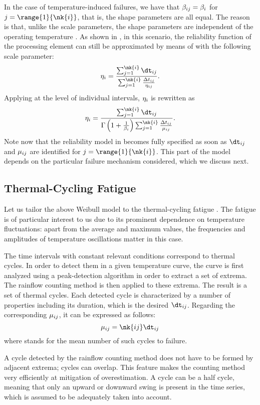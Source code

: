In the case of temperature-induced failures, we have that $\beta_{ij} =
\beta_i$ for $j = \range{1}{\nk{i}}$, that is, the shape parameters are all
equal. The reason is that, unlike the scale parameters, the shape parameters are
independent of the operating temperature \cite{chang2006}. As shown in
\cite{xiang2010}, in this scenario, the reliability function of the processing
element can still be approximated by means of  with
the following scale parameter:
\[
  \scale_i = \frac{\sum_{j = 1}^{\nk{i}} \dt_{ij}}{\sum_{j = 1}^{\nk{i}} \frac{\Delta t_{ij}}{\scale_{ij}}}.
\]
Applying  at the level of individual intervals,
$\eta_i$ is rewritten as
\[
  \scale_i = \frac{\sum_{j = 1}^{\nk{i}} \dt_{ij}}{\Gamma\left(1 + \frac{1}{\shape_i}\right) \sum_{j = 1}^{\nk{i}} \frac{\Delta t_{ij}}{\mean_{ij}}}.
\]
Note now that the reliability model in  becomes fully
specified as soon as $\dt_{ij}$ and $\mu_{ij}$ are identified for $j =
\range{1}{\nk{i}}$. This part of the model depends on the particular failure
mechanism considered, which we discuss next.

\subsection{Thermal-Cycling Fatigue}

Let us tailor the above Weibull model to the thermal-cycling fatigue
\cite{jedec2016}. The fatigue is of particular interest to us due to its
prominent dependence on temperature fluctuations: apart from the average and
maximum values, the frequencies and amplitudes of temperature oscillations
matter in this case.

The time intervals with constant relevant conditions correspond to thermal
cycles. In order to detect them in a given temperature curve, the curve is first
analyzed using a peak-detection algorithm in order to extract a set of extrema.
The rainflow counting method \cite{xiang2010} is then applied to these extrema.
The result is a set of  thermal cycles. Each detected cycle is
characterized by a number of properties including its duration, which is the
desired $\dt_{ij}$. Regarding the corresponding $\mu_{ij}$, it can be
expressed as follows:
\[
  \mean_{ij} = \nk{ij} \dt_{ij}
\]
where  stands for the mean number of such cycles to failure.

\begin{remark}
A cycle detected by the rainflow counting method does not have to be formed by
adjacent extrema; cycles can overlap. This feature makes the counting method
very efficiently at mitigation of overestimation. A cycle can be a half cycle,
meaning that only an upward or downward swing is present in the time series,
which is assumed to be adequately taken into account.
\end{remark}

